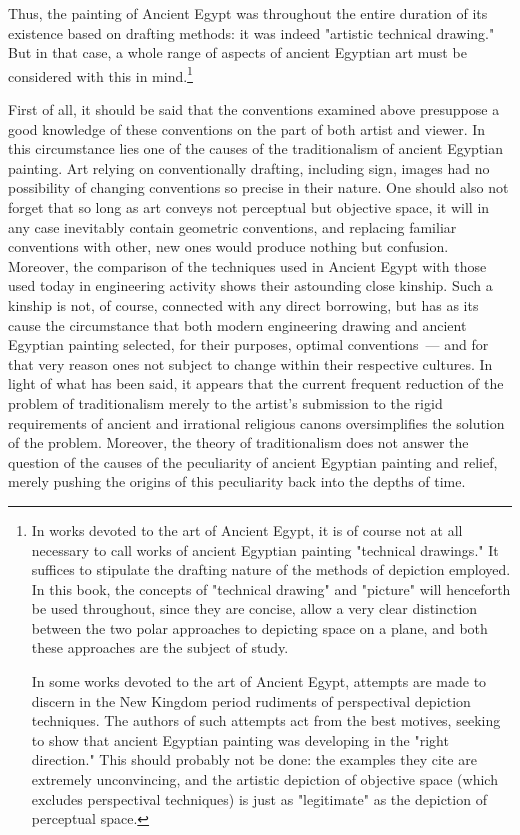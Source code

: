 Thus, the painting of Ancient Egypt was throughout the entire duration of its existence
based on drafting methods: it was indeed "artistic technical drawing." But in that case,
a whole range of aspects of ancient Egyptian art must be considered with this in mind.\footnote{%
  In works devoted to the art of Ancient Egypt, it is of course not at all necessary to
  call works of ancient Egyptian painting "technical drawings." It suffices to stipulate
  the drafting nature of the methods of depiction employed. In this book, the concepts
  of "technical drawing" and "picture" will henceforth be used throughout, since they
  are concise, allow a very clear distinction between the two polar approaches to
  depicting space on a plane, and both these approaches are the subject of study.
  \par In some works devoted to the art of Ancient Egypt, attempts are made to
  discern in the New Kingdom period rudiments of perspectival depiction techniques.
  The authors of such attempts act from the best motives, seeking to show that ancient
  Egyptian painting was developing in the "right direction." This should probably not
  be done: the examples they cite are extremely unconvincing, and the artistic depiction
  of objective space (which excludes perspectival techniques) is just as "legitimate" as
  the depiction of perceptual space.}

First of all, it should be said that the conventions examined above presuppose a good
knowledge of these conventions on the part of both artist and viewer. In this
circumstance lies one of the causes of the traditionalism of ancient Egyptian painting.
Art relying on conventionally drafting, including sign, images had no possibility of
changing conventions so precise in their nature. One should also not forget that so long
as art conveys not perceptual but objective space, it will in any case inevitably contain
geometric conventions, and replacing familiar conventions with other, new ones would
produce nothing but confusion. Moreover, the comparison of the techniques used in
Ancient Egypt with those used today in engineering activity shows their astounding
close kinship. Such a kinship is not, of course, connected with any direct borrowing, but
has as its cause the circumstance that both modern engineering drawing and ancient
Egyptian painting selected, for their purposes, optimal conventions~--- and for that very
reason ones not subject to change within their respective cultures. In light of what has
been said, it appears that the current frequent reduction of the problem of traditionalism
merely to the artist's submission to the rigid requirements of ancient and irrational
religious canons oversimplifies the solution of the problem. Moreover, the theory of
traditionalism does not answer the question of the causes of the peculiarity of ancient
Egyptian painting and relief, merely pushing the origins of this peculiarity back into
the depths of time.


